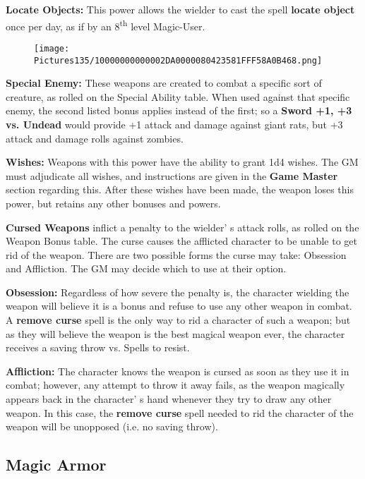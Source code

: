 \documentclass[a4paper,twoside,openany,10pt]{book}
\begin{document}
\begin{multicols}{2}
\textbf{Locate Objects:} This power allows the wielder to cast the spell \textbf{locate object} once per day, as if by an 8\textsuperscript{th} level Magic-User.

\begin{wrapfigure}{l}{0.25\textwidth}
	\texttt{[image: Pictures135/10000000000002DA0000080423581FFF58A0B468.png]}\medskip
\end{wrapfigure}

\textbf{Special Enemy:} These weapons are created to combat a specific sort of creature, as rolled on the Special Ability table. When used against that specific enemy, the second listed bonus applies instead of the first; so a \textbf{Sword +1, +3 vs. Undead} would provide +1 attack and damage against giant rats, but +3 attack and damage rolls against zombies.

\textbf{Wishes:} Weapons with this power have the ability to grant 1d4 wishes. The GM must adjudicate all wishes, and instructions are given in the \textbf{Game Master} section regarding this. After these wishes have been made, the weapon loses this power, but retains any other bonuses and powers.

\textbf{Cursed Weapons} inflict a penalty to the wielder' s attack rolls, as rolled on the Weapon Bonus table. The curse causes the afflicted character to be unable to get rid of the weapon. There are two possible forms the curse may take: Obsession and Affliction. The GM may decide which to use at their option. 

\textbf{Obsession:} Regardless of how severe the penalty is, the character wielding the weapon will believe it is a bonus and refuse to use any other weapon in combat. A \textbf{remove curse} spell is the only way to rid a character of such a weapon; but as they will believe the weapon is the best magical weapon ever, the character receives a saving throw vs. Spells to resist.

\textbf{Affliction: } The character knows the weapon is cursed as soon as they use it in combat; however, any attempt to throw it away fails, as the weapon magically appears back in the character' s hand whenever they try to draw any other weapon. In this case, the \textbf{remove curse} spell needed to rid the character of the weapon will be unopposed (i.e. no saving throw).


\subsection{Magic Armor}\label{magic-armor-1}


\end{multicols}
\end{document}
